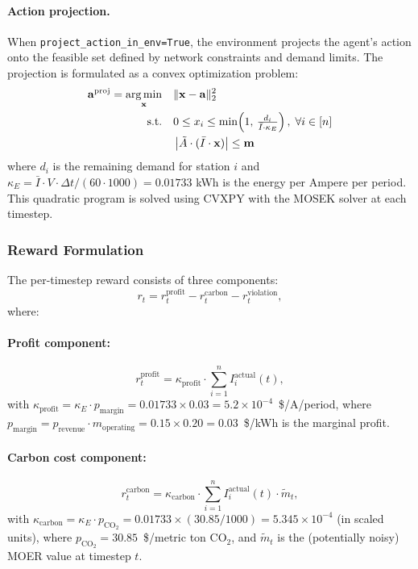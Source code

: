 \paragraph{Action projection.} When \texttt{project\_action\_in\_env=True}, the environment projects the agent's action onto the feasible set defined by network constraints and demand limits. The projection is formulated as a convex optimization problem:
\begin{equation}
    \begin{aligned}
    \mathbf{a}^{\text{proj}} = \operatorname*{arg\,min}_{\mathbf{x}} \quad & \|\mathbf{x} - \mathbf{a}\|_2^2 \\
    \text{s.t.} \quad & 0 \leq x_i \leq \min\!\left(1, \, \tfrac{d_i}{\bar{I} \cdot \kappa_E}\right), \; \forall i \in [n] \\
    & \left|\tilde{A} \cdot (\bar{I} \cdot \mathbf{x})\right| \leq \mathbf{m}
    \end{aligned}
    \label{eq:ev_projection}
\end{equation}
where $d_i$ is the remaining demand for station $i$ and $\kappa_E = \bar{I} \cdot V \cdot \Delta t / (60 \cdot 1000) = 0.01733$ kWh is the energy per Ampere per period. This quadratic program is solved using CVXPY with the MOSEK solver at each timestep.

\subsubsection{Reward Formulation}

The per-timestep reward consists of three components:
\begin{equation}
    r_t = r_t^{\text{profit}} - r_t^{\text{carbon}} - r_t^{\text{violation}},
    \label{eq:ev_reward}
\end{equation}
where:

\paragraph{Profit component:}
\begin{equation}
    r_t^{\text{profit}} = \kappa_{\text{profit}} \cdot \sum_{i=1}^{n} I_i^{\text{actual}}(t),
\end{equation}
with $\kappa_{\text{profit}} = \kappa_E \cdot p_{\text{margin}} = 0.01733 \times 0.03 = 5.2 \times 10^{-4}$~\$/A/period, where $p_{\text{margin}} = p_{\text{revenue}} \cdot m_{\text{operating}} = 0.15 \times 0.20 = 0.03$~\$/kWh is the marginal profit.

\paragraph{Carbon cost component:}
\begin{equation}
    r_t^{\text{carbon}} = \kappa_{\text{carbon}} \cdot \sum_{i=1}^{n} I_i^{\text{actual}}(t) \cdot \tilde{m}_t,
\end{equation}
with $\kappa_{\text{carbon}} = \kappa_E \cdot p_{\text{CO}_2} = 0.01733 \times (30.85/1000) = 5.345 \times 10^{-4}$ (in scaled units), where $p_{\text{CO}_2} = 30.85$~\$/metric ton CO$_2$, and $\tilde{m}_t$ is the (potentially noisy) MOER value at timestep $t$.

